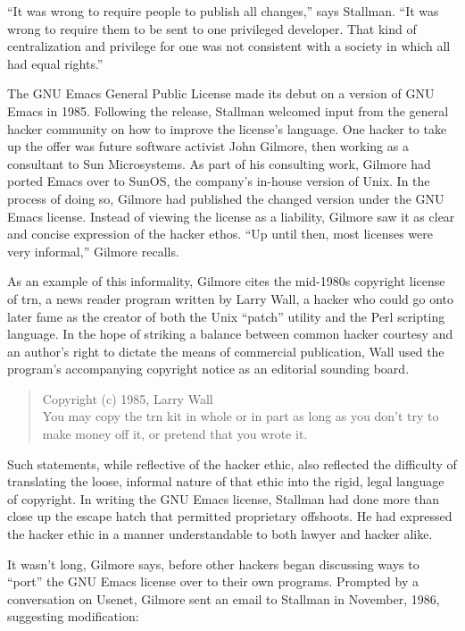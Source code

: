 ``It was wrong to require people to publish all changes,'' says Stallman. ``It was wrong to require them to be sent to one privileged developer. That kind of centralization and privilege for one was not consistent with a society in which all had equal rights.''

The GNU Emacs General Public License made its debut on a version of GNU Emacs in 1985. Following the release, Stallman welcomed input from the general hacker community on how to improve the license's language. One hacker to take up the offer was future software activist John Gilmore, then working as a consultant to Sun Microsystems. As part of his consulting work, Gilmore had ported Emacs over to SunOS, the company's in-house version of Unix. In the process of doing so, Gilmore had published the changed version under the GNU Emacs license. Instead of viewing the license as a liability, Gilmore saw it as clear and concise expression of the hacker ethos. ``Up until then, most licenses were very informal,'' Gilmore recalls.

As an example of this informality, Gilmore cites the mid-1980s copyright license of trn, a news reader program written by Larry Wall, a hacker who could go onto later fame as the creator of both the Unix ``patch'' utility and the Perl scripting language. In the hope of striking a balance between common hacker courtesy and an author's right to dictate the means of commercial publication, Wall used the program's accompanying copyright notice as an editorial sounding board.

\begin{quote}
Copyright (c) 1985, Larry Wall\\
You may copy the trn kit in whole or in part as long as you don't try to make money off it, or pretend that you wrote it.
\end{quote}

Such statements, while reflective of the hacker ethic, also reflected the difficulty of translating the loose, informal nature of that ethic into the rigid, legal language of copyright. In writing the GNU Emacs license, Stallman had done more than close up the escape hatch that permitted proprietary offshoots. He had expressed the hacker ethic in a manner understandable to both lawyer and hacker alike.

It wasn't long, Gilmore says, before other hackers began discussing ways to ``port'' the GNU Emacs license over to their own programs. Prompted by a conversation on Usenet, Gilmore sent an email to Stallman in November, 1986, suggesting modification:

